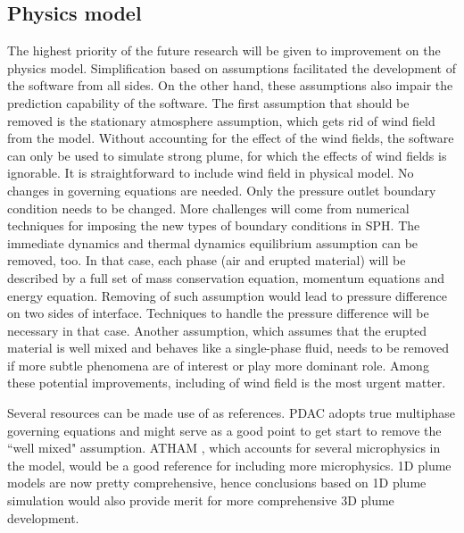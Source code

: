 \subsection{Physics model}
The highest priority of the future research will be given to improvement on the physics model. Simplification based on assumptions facilitated the development of the software from all sides. On the other hand, these assumptions also impair the prediction capability of the software. The first assumption that should be removed is the stationary atmosphere assumption, which gets rid of wind field from the model. Without accounting for the effect of the wind fields, the software can only be used to simulate strong plume, for which the effects of wind fields is ignorable. It is straightforward to include wind field in physical model. No changes in governing equations are needed. Only the pressure outlet boundary condition needs to be changed. More challenges will come from numerical techniques for imposing the new types of boundary conditions in SPH. 
The immediate dynamics and thermal dynamics equilibrium assumption can be removed, too. In that case, each phase (air and erupted material) will be described by a full set of mass conservation equation, momentum equations and energy equation. Removing of such assumption would lead to pressure difference on two sides of interface. Techniques to handle the pressure difference will be necessary in that case. Another assumption, which assumes that the erupted material is well mixed and behaves like a single-phase fluid, needs to be removed if more subtle phenomena are of interest or play more dominant role. Among these potential improvements, including of wind field is the most urgent matter.

Several resources can be made use of as references. PDAC\citep{neri2003multiparticle} adopts true multiphase governing equations and might serve as a good point to get start to remove the ``well mixed" assumption. ATHAM  \citep{oberhuber1998volcanic}, which accounts for several microphysics in the model, would be a good reference for including more microphysics. 1D plume models \citep{bursik2001effect, pouget2016sensitivity, folch2016fplume} are now pretty comprehensive, hence conclusions based on 1D plume simulation would also provide merit for more comprehensive 3D plume development.

